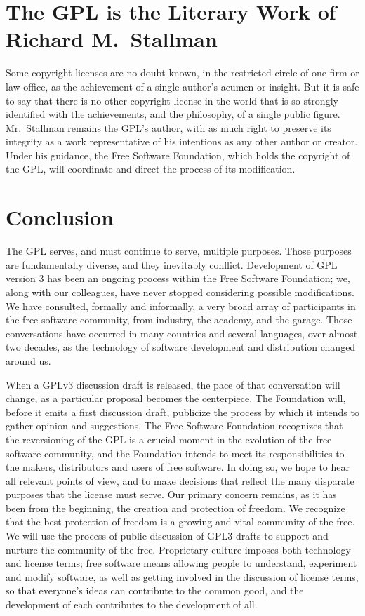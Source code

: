\documentclass[11pt, letterpaper]{book}
\begin{document}
\section*{The GPL is the Literary Work of Richard M.\ Stallman}

Some copyright licenses are no doubt known, in the restricted circle
of one firm or law office, as the achievement of a single author's
acumen or insight.  But it is safe to say that there is no other
copyright license in the world that is so strongly identified with the
achievements, and the philosophy, of a single public figure.  Mr.\
Stallman remains the GPL's author, with as much right to preserve its
integrity as a work representative of his intentions as any other
author or creator.  Under his guidance, the Free Software Foundation,
which holds the copyright of the GPL, will coordinate and direct the
process of its modification.

\section*{Conclusion}

The GPL serves, and must continue to serve, multiple purposes.  Those
purposes are fundamentally diverse, and they inevitably conflict.
Development of GPL version 3 has been an ongoing process within the
Free Software Foundation; we, along with our colleagues, have never
stopped considering possible modifications.  We have consulted,
formally and informally, a very broad array of participants in the
free software community, from industry, the academy, and the garage.
Those conversations have occurred in many countries and several
languages, over almost two decades, as the technology of software
development and distribution changed around us.

When a GPLv3 discussion draft is released, the pace of that
conversation will change, as a particular proposal becomes the
centerpiece.  The Foundation will, before it emits a first discussion
draft, publicize the process by which it intends to gather opinion and
suggestions.  The Free Software Foundation recognizes that the
reversioning of the GPL is a crucial moment in the evolution of the
free software community, and the Foundation intends to meet its
responsibilities to the makers, distributors and users of free
software.  In doing so, we hope to hear all relevant points of view,
and to make decisions that reflect the many disparate purposes that
the license must serve.  Our primary concern remains, as it has been
from the beginning, the creation and protection of freedom.  We
recognize that the best protection of freedom is a growing and vital
community of the free.  We will use the process of public discussion
of GPL3 drafts to support and nurture the community of the free.
Proprietary culture imposes both technology and license terms; free
software means allowing people to understand, experiment and modify
software, as well as getting involved in the discussion of license
terms, so that everyone's ideas can contribute to the common good, and
the development of each contributes to the development of all.

\end{document}
